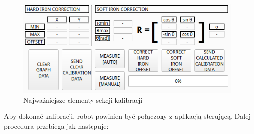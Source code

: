 \begin{figure}[ht]
	\centering
		\includegraphics[width=1\linewidth]{rys/main-app-view-magnetom-bottom.png}
	\caption{Najważniejsze elementy sekcji kalibracji}
	\label{fig:main-app-mag-section-bottom}
\end{figure}

Aby dokonać kalibracji, robot powinien być połączony z aplikacją sterującą. Dalej procedura przebiega jak następuje:

